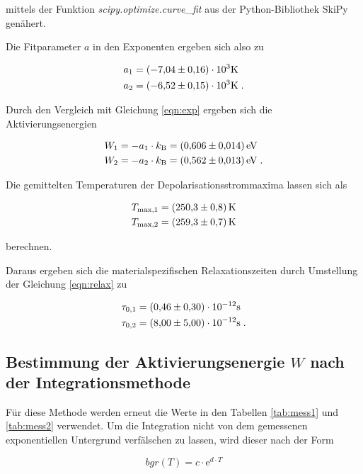 mittels der Funktion \textit{scipy.optimize.curve\_fit} aus der Python-Bibliothek SkiPy genähert.

Die Fitparameter $a$ in den Exponenten ergeben sich also zu

\begin{align*}
  a_1 &= (\num{-7.04 +- 0.16})\cdot 10^3 \si{\kelvin} \\
  a_2 &= (\num{-6.52 +- 0.15})\cdot 10^3 \si{\kelvin} \; .
\end{align*}

Durch den Vergleich mit Gleichung \eqref{eqn:exp} ergeben sich die Aktivierungsenergien

\begin{align*}
  W_1 &= -a_1 \cdot k_\text{B} = \SI{0.606 +- 0.014}{\eV} \\
  W_2 &= -a_2 \cdot k_\text{B} = \SI{0.562 +- 0.013}{\eV}  \; .
\end{align*}

Die gemittelten Temperaturen der Depolarisationsstrommaxima lassen sich als

\begin{align*}
  T_\text{max,1} &= \SI{250.3 +- 0.8}{\kelvin} \\
  T_\text{max,2} &= \SI{259.3 +- 0.7}{\kelvin}
\end{align*}

berechnen.

Daraus ergeben sich die materialspezifischen Relaxationszeiten durch Umstellung der Gleichung \eqref{eqn:relax} zu

\begin{align*}
  \tau_{0,1} &= (\num{0.46 +- 0.30}) \cdot 10^{-12} \si{\second}\\
  \tau_{0,2} &= (\num{8.00 +- 5.00}) \cdot 10^{-12} \si{\second} \; .
\end{align*}

\subsection{Bestimmung der Aktivierungsenergie $W$ nach der Integrationsmethode}

Für diese Methode werden erneut die Werte in den Tabellen \ref{tab:mess1} und \ref{tab:mess2} verwendet.
Um die Integration nicht von dem gemessenen exponentiellen Untergrund verfälschen zu lassen, wird dieser 
nach der Form 

\begin{equation}
  bgr(T) = c \cdot \text{e}^{d \cdot T}
\end{equation}

